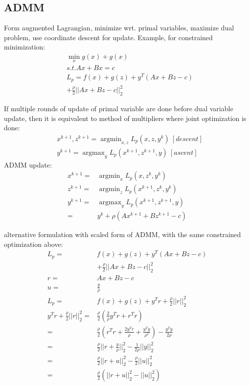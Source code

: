 \documentclass[8pt]{report}
\DeclareMathOperator*{\argmin}{argmin}
\DeclareMathOperator*{\argmax}{argmax}
\begin{document}
\begin{multicols*}{2}
  \vfill\null
  \columnbreak
  
  \section{ADMM}

  Form augmented Lagrangian, minimize wrt. primal variables, maximize dual problem, use coordinate descent for update. Example, for constrained minimization:
  \begin{align*}
    & \min_x g(x) + g(x)\\
    & s.t. Ax + Bx = c\\
    & L_p = f(x) + g(z) + y^T(Ax+Bz-c)\\
    & + \frac{\rho}{2} ||Ax+Bz-c||_2^2
  \end{align*}
  
  If multiple rounds of update of primal variable are done before dual variable update, then it is equivalent to method of multipliers where joint optimization is done:
  \begin{align*}
    &x^{k+1}, z^{k+1} = \argmin_{x,z} L_p(x,z,y^k)\ [descent]\\
    &y^{k+1} = \argmax_{y} L_p(x^{k+1},z^{k+1},y)\ [ascent]
  \end{align*}
  ADMM update:
  \begin{align*}
    x^{k+1} = & \argmin_{x} L_p(x,z^k,y^k)\\
    z^{k+1} = & \argmin_{z} L_p(x^{k+1},z^k,y^k)\\
    y^{k+1} = & \argmax_{y} L_p(x^{k+1},z^{k+1},y)\\
              = & y^k + \rho(Ax^{k+1} + Bz^{k+1} -c)
  \end{align*}

  alternative formulation with scaled form of ADMM, with the same constrained optimization above:
  \begin{align*}
    L_p = & f(x) + g(z) + y^T(Ax+Bz-c)\\
          & + \frac{\rho}{2} ||Ax+Bz-c||_2^2\\
    r= & Ax+Bz-c\\
           u = & \frac{y}{\rho}\\
           L_p = & f(x) + g(z) + y^T r + \frac{\rho}{2} ||r||_2^2\\
    y^T r + \frac{\rho}{2} ||r||_2^2 = & \frac{\rho}{2}( \frac{2}{\rho} y^T r + r^T r)\\
    = & \frac{\rho}{2}(r^T r + \frac{2 y^T r}{\rho} + \frac{ y^T y}{\rho ^2}) - \frac{y^T y}{2\rho}\\
    = & \frac{\rho}{2} ||r+\frac{y}{\rho}||_2^2 - \frac{1}{2 \rho} ||y||_2^2\\
    = & \frac{\rho}{2} ||r+u||_2^2 - \frac{\rho}{2}||u||_2^2\\
    = & \frac{\rho}{2} (||r+u||_2^2 - ||u||_2^2)
  \end{align*}


\end{multicols*}
\end{document}
